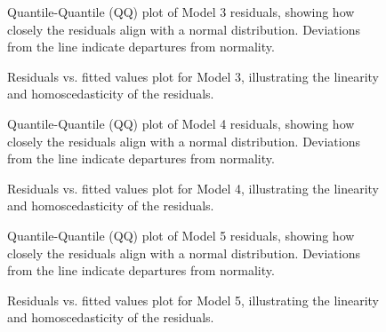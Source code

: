 \documentclass[10pt,letterpaper]{article}
\begin{document}
\begin{figure}[htb]
  \caption{Quantile-Quantile (QQ) plot of Model 3 residuals, showing how closely the residuals align with a normal distribution. Deviations from the line indicate departures from normality.}
\end{figure}

\begin{figure}[htb]
  \caption{Residuals vs. fitted values plot for Model 3, illustrating the linearity and homoscedasticity of the residuals.}
\end{figure}

\begin{figure}[htb]
  \caption{Quantile-Quantile (QQ) plot of Model 4 residuals, showing how closely the residuals align with a normal distribution. Deviations from the line indicate departures from normality.}
\end{figure}

\begin{figure}[htb]
  \caption{Residuals vs. fitted values plot for Model 4, illustrating the linearity and homoscedasticity of the residuals.}
\end{figure}
\begin{figure}[htb]
  \caption{Quantile-Quantile (QQ) plot of Model 5 residuals, showing how closely the residuals align with a normal distribution. Deviations from the line indicate departures from normality.}
\end{figure}

\begin{figure}[htb]
  \caption{Residuals vs. fitted values plot for Model 5, illustrating the linearity and homoscedasticity of the residuals.}
\end{figure}
\par

\end{document}
